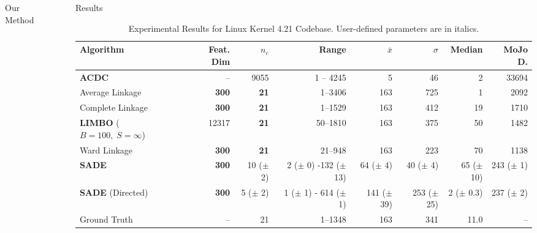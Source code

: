 \documentclass[final]{beamer}
\newlength{\sepwidth}
\newlength{\colwidth}
\newcommand{\separatorcolumn}{\begin{column}{\sepwidth}\end{column}}
\begin{document}
\begin{frame}[t]
\begin{columns}[t]
\begin{column}{\colwidth}
\begin{alertblock}{Our Method}
\end{alertblock}

	
	
	
	

\end{column}

\separatorcolumn

\begin{column}{\colwidth}

	

  \begin{block}{Results}

    

    \begin{table}
      \centering
      \small
\begin{tabular}{lrrrrrrr}
    \toprule
    \textbf{Algorithm} & \textbf{Feat. Dim}  & $n_c$ & \textbf{Range} & $\bar x$ & $\sigma$ & \textbf{Median} & \textbf{MoJo D.} \\
    \midrule
    \textbf{ACDC}  & -- & 9055 & 1 -- 4245 & 5 & 46 & 2 & 33694\\
    Average Linkage  & \textbf{300} & \textbf{21} & 1--3406 & 163 & 725 & 1 & 2092 \\
    Complete Linkage  & \textbf{300} & \textbf{21} & 1--1529 & 163 & 412 & 19 & 1710 \\
    \textbf{LIMBO}  ($B=100, \; S = \infty$) & 12317 &\textbf{21} & 50--1810 & 163 & 375 & 50  & 1482 \\

    Ward Linkage & \textbf{300} & \textbf{21} & 21--948 & 163 & 223 & 70 & 1138 \\
        
    \textbf{SADE} & \textbf{300} & 10 ($\pm$ 2)  & 2 ($\pm$ 0) -132 ($\pm$ 13) & 64 ($\pm$ 4) & 40 ($\pm$ 4) & 65 ($\pm$ 10) & 243 ($\pm$ 1)  \\
    \textbf{SADE} (Directed) & \textbf{300} & 5 ($\pm$ 2) & 1 ($\pm$ 1) - 614 ($\pm$ 1) & 141 ($\pm$ 39) & 253 ($\pm$ 25) & 2 ($\pm$ 0.3)  & 237 ($\pm$ 2) \\
    \midrule
    Ground Truth & -- & 21 & 1--1348 & 163 & 341 & 11.0 & -- \\
    \bottomrule
  \end{tabular}

      \caption{Experimental Results for Linux Kernel 4.21 Codebase. User-defined parameters are in italics.}
    \end{table}



\end{block}
\end{column}
\end{columns}
\end{frame}
\end{document}
